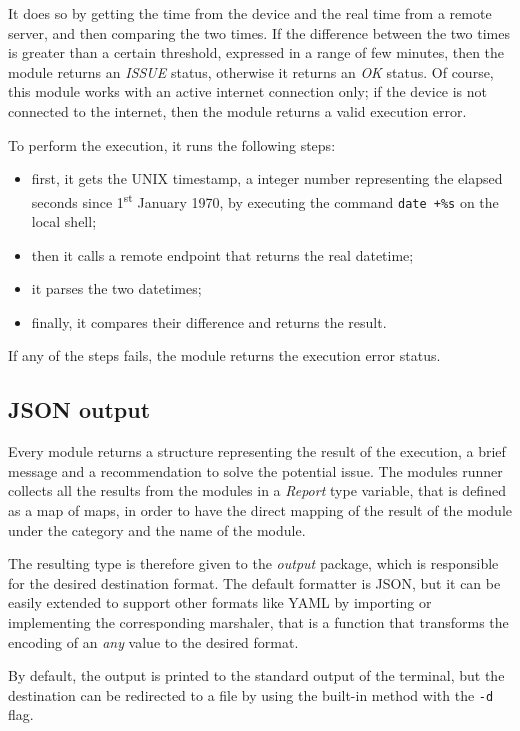 It does so by getting the time from the device and the real time from a remote server, and then comparing the two times. If the difference between the two times is greater than a certain threshold, expressed in a range of few minutes, then the module returns an \textit{ISSUE} status, otherwise it returns an \textit{OK} status. Of course, this module works with an active internet connection only; if the device is not connected to the internet, then the module returns a valid execution error.

To perform the execution, it runs the following steps:
\begin{itemize}
  \item first, it gets the UNIX timestamp, a integer number representing the elapsed seconds since 1\textsuperscript{st} January 1970, by executing the command \texttt{date +\%s} on the local shell;
  \item then it calls a remote endpoint that returns the real datetime;
  \item it parses the two datetimes;
  \item finally, it compares their difference and returns the result.
\end{itemize}

If any of the steps fails, the module returns the execution error status.


\subsection{JSON output}
\label{sec:json-output}

Every module returns a structure representing the result of the execution, a brief message and a recommendation to solve the potential issue. The modules runner collects all the results from the modules in a \textit{Report} type variable, that is defined as a map of maps, in order to have the direct mapping of the result of the module under the category and the name of the module.

The resulting type is therefore given to the \textit{output} package, which is responsible for the desired destination format. The default formatter is JSON, but it can be easily extended to support other formats like YAML by importing or implementing the corresponding marshaler, that is a function that transforms the encoding of an \textit{any} value to the desired format.

By default, the output is printed to the standard output of the terminal, but the destination can be redirected to a file by using the built-in method with the \texttt{-d} flag.

